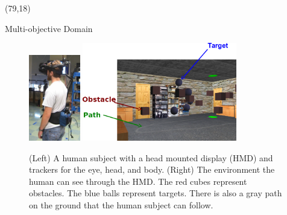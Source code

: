 \documentclass[final]{beamer}
\begin{document}
\begin{frame}{}
\begin{textblock}{69}(79,18)
\begin{block}{Multi-objective Domain}
\begin{figure}[h]
\centering
\includegraphics[width=0.2\textwidth]{human.jpg}
\includegraphics[width=0.6\textwidth]{env.png}
\caption{(Left) A human subject with a head mounted display (HMD) and trackers
for the eye, head, and body.  (Right) The environment the human can see through
the HMD.  The red cubes represent obstacles. The blue balls represent targets.
There is also a gray path on the ground that the human subject can follow.}
\label{fig:avatar}
\end{figure}
\end{block}


\end{textblock}
\end{frame}
\end{document}
